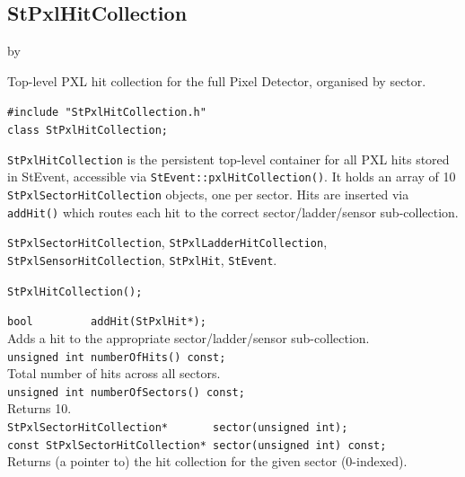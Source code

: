 \documentclass[twoside]{article}
\newcommand{\StEvent}{\textsf{StEvent}}
\newcommand{\entrylabel}[1]{\mbox{\textbf{{#1}}}\hfil}%
\newenvironment{entry}
{\begin{list}{}%
    {\renewcommand{\makelabel}{\entrylabel}%
     \setlength{\labelwidth}{90pt}%
     \setlength{\leftmargin}{\labelwidth}
     \advance\leftmargin by \labelsep%
      }%
    }%
  {\end{list}}
\newcommand{\Entrylabel}[1]%
{\raisebox{0pt}[1ex][0pt]{\makebox[\labelwidth][l]%
    {\parbox[t]{\labelwidth}{\hspace{0pt}\textbf{{#1}}}}}}
\newenvironment{Entry}%
{\renewcommand{\entrylabel}{\Entrylabel}\begin{entry}}%
  {\end{entry}}
\begin{document}
\subsection{StPxlHitCollection}
\label{sec:StPxlHitCollection}
\begin{Entry}
\item[Summary] Top-level PXL hit collection for the full Pixel Detector,
    organised by sector.
\item[Synopsis]
    \verb+#include "StPxlHitCollection.h"+\\
    \verb+class StPxlHitCollection;+\\
\item[Description]
    \texttt{StPxlHitCollection} is the persistent top-level container for all
    PXL hits stored in \StEvent, accessible via
    \verb+StEvent::pxlHitCollection()+.  It holds an array of 10
    \texttt{StPxlSectorHitCollection} objects, one per sector.  Hits are
    inserted via \verb+addHit()+ which routes each hit to the correct
    sector/ladder/sensor sub-collection.
\item[Related Classes]
    \texttt{StPxlSectorHitCollection}, \texttt{StPxlLadderHitCollection},
    \texttt{StPxlSensorHitCollection}, \texttt{StPxlHit}, \texttt{StEvent}.
\item[Public\\ Constructors]
    \verb+StPxlHitCollection();+\\
\item[Public Member\\ Functions]
    \verb+bool         addHit(StPxlHit*);+\\
    Adds a hit to the appropriate sector/ladder/sensor sub-collection.\\
    \verb+unsigned int numberOfHits() const;+\\
    Total number of hits across all sectors.\\
    \verb+unsigned int numberOfSectors() const;+\\
    Returns 10.\\
    \verb+StPxlSectorHitCollection*       sector(unsigned int);+\\
    \verb+const StPxlSectorHitCollection* sector(unsigned int) const;+\\
    Returns (a pointer to) the hit collection for the given sector (0-indexed).\\
\end{Entry}
\clearpage
\end{document}
